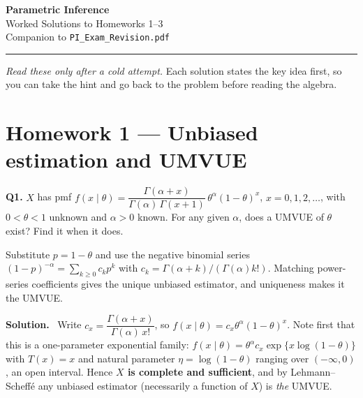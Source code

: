 \documentclass[11pt]{article}
\newenvironment{prob}[1]{\medskip\noindent\textbf{\large #1}\quad}{\par}
\newcommand{\soln}{\medskip\noindent\textbf{Solution.}\ }
\begin{document}
\begin{center}
{\LARGE\bfseries Parametric Inference}\\[3pt]
{\large Worked Solutions to Homeworks 1--3}\\[4pt]
{\small Companion to \texttt{PI\_Exam\_Revision.pdf}}
\end{center}

\vspace{4pt}\hrule\vspace{10pt}

\noindent\emph{Read these only after a cold attempt.} Each solution states the key idea first,
so you can take the hint and go back to the problem before reading the algebra.

\tableofcontents
\newpage

\section{Homework 1 --- Unbiased estimation and UMVUE}

\begin{prob}{Q1.}
$X$ has pmf $f(x\mid\theta)=\dfrac{\Gamma(\alpha+x)}{\Gamma(\alpha)\,\Gamma(x+1)}\,
\theta^{\alpha}(1-\theta)^{x}$, $x=0,1,2,\dots$, with $0<\theta<1$ unknown and $\alpha>0$
known. For any given $\alpha$, does a UMVUE of $\theta$ exist? Find it when it does.
\end{prob}

\begin{ideabox}
Substitute $p=1-\theta$ and use the negative binomial series
$(1-p)^{-\alpha}=\sum_{k\ge0}c_k p^k$ with $c_k=\Gamma(\alpha+k)/(\Gamma(\alpha)k!)$.
Matching power-series coefficients gives the unique unbiased estimator, and uniqueness
makes it the UMVUE.
\end{ideabox}

\soln
Write $c_x=\dfrac{\Gamma(\alpha+x)}{\Gamma(\alpha)\,x!}$, so $f(x\mid\theta)=c_x\theta^\alpha(1-\theta)^x$.
Note first that this is a one-parameter exponential family:
$f(x\mid\theta)=\theta^{\alpha}c_x\exp\{x\log(1-\theta)\}$ with $T(x)=x$ and natural parameter
$\eta=\log(1-\theta)$ ranging over $(-\infty,0)$, an open interval. Hence \textbf{$X$ is
complete and sufficient}, and by Lehmann--Scheff\'e any unbiased estimator (necessarily a
function of $X$) is \emph{the} UMVUE.
\end{document}
